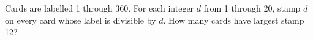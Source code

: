 Cards are labelled 1 through 360. For each integer $d$ from 1 through 20, stamp $d$ on every card whose label is divisible by $d$. How many cards have largest stamp 12?
